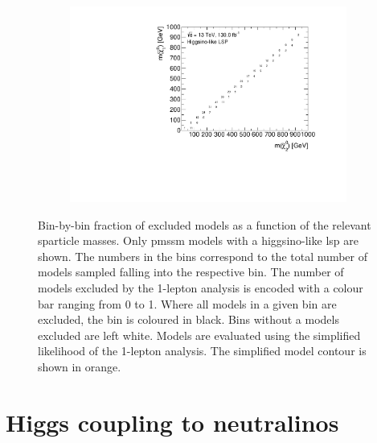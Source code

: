 \begin{figure}
\begin{subfigure}[b]{0.5\linewidth}
		\centering\includegraphics[width=\textwidth]{cut_higgsino_LSP/mchi1p_mchi20_contour}
		\caption{\label{fig:mchi1p_mchi20_contour_higgsino_lsp}}
	\end{subfigure}\hfill
	\caption{Bin-by-bin fraction of excluded models as a function of the relevant sparticle masses. Only \gls{pmssm} models with a higgsino-like \gls{lsp} are shown. The numbers in the bins correspond to the total number of models sampled falling into the respective bin. The number of models excluded by the 1-lepton analysis is encoded with a colour bar ranging from 0 to 1. Where all models in a given bin are excluded, the bin is coloured in black. Bins without a models excluded are left white. Models are evaluated using the simplified likelihood of the 1-lepton analysis. The simplified model contour is shown in orange.}
	\label{fig:impact_electroweakinos_2D_higgsino_lsp}
\end{figure}


\section{Higgs coupling to neutralinos}

